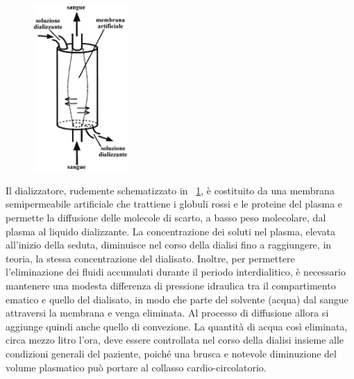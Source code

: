 \begin{figure}
	\centering
	\vspace{-30pt}
		\includegraphics[width=0.32\textwidth]{immagini/emod.eps}
		\vspace{-30pt}
		\caption{}\label{membHD}
		\vspace{-10pt}
\end{figure}

Il dializzatore, rudemente schematizzato in \figurename~\ref{membHD}, è costituito da una membrana semipermeabile artificiale che trattiene i globuli rossi e le proteine del plasma e permette la diffusione delle molecole di scarto, a basso peso molecolare, dal plasma al liquido dializzante. La concentrazione dei soluti nel plasma, elevata all'inizio della seduta, diminuisce nel corso della dialisi fino a raggiungere, in teoria, la stessa concentrazione del dialisato. Inoltre, per permettere l'eliminazione dei fluidi accumulati durante il periodo interdialitico, è necessario mantenere una modesta differenza di pressione idraulica tra il compartimento ematico e quello del dialisato, in modo che parte del solvente (acqua) dal sangue attraversi la membrana e venga eliminata. Al processo di diffusione allora si aggiunge quindi anche quello di convezione. La quantità di acqua così eliminata, circa mezzo litro l'ora, deve essere controllata nel corso della dialisi insieme alle condizioni generali del paziente, poiché una brusca e notevole diminuzione del volume plasmatico può portare al collasso cardio-circolatorio.

